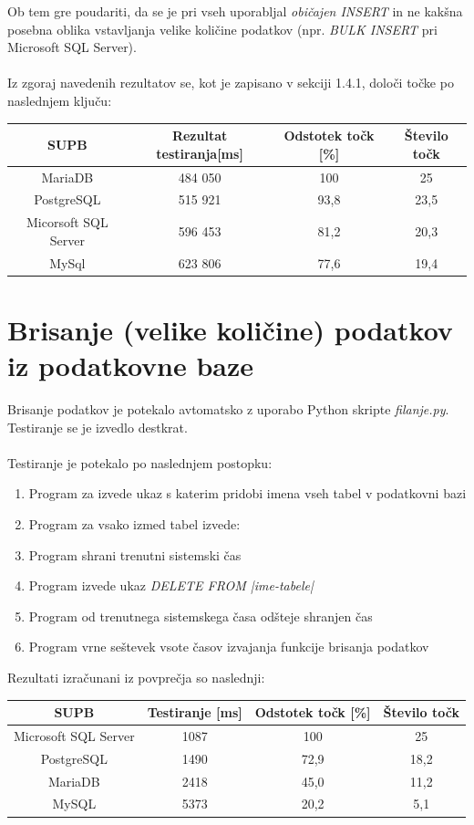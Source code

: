 \documentclass[a4paper,11pt]{report}
\begin{document}
Ob tem gre poudariti, da se je pri vseh uporabljal \textit{običajen INSERT} in ne kakšna posebna oblika vstavljanja velike količine podatkov (npr. \textit{BULK INSERT} pri Microsoft SQL Server).
\\\\
Iz zgoraj navedenih rezultatov se, kot je zapisano v sekciji 1.4.1, določi točke po naslednjem ključu:

\begin{center}
   \begin{tabular}{||c|c|c|c||}
      \hline
      \textbf{SUPB} & Rezultat testiranja[ms] & Odstotek točk [\%] & Število točk\\
      \hline
      \hline
      MariaDB & 484 050 & 100 & 25\\
      PostgreSQL & 515 921 & 93,8 & 23,5\\
      Micorsoft SQL Server & 596 453 & 81,2 & 20,3\\
      MySql & 623 806 & 77,6 & 19,4\\
      \hline
   \end{tabular}
\end{center}

\section{Brisanje (velike količine) podatkov iz podatkovne baze}
Brisanje podatkov je potekalo avtomatsko z uporabo Python skripte \textit{filanje.py}. Testiranje se je izvedlo destkrat.
\\\\

Testiranje je potekalo po naslednjem postopku:
\begin{enumerate}
   \item Program za izvede ukaz s katerim pridobi imena vseh tabel v podatkovni bazi
   \item Program za vsako izmed tabel izvede:
      \item Program shrani trenutni sistemski čas
      \item Program izvede ukaz \textit{DELETE FROM |ime-tabele|}
      \item Program od trenutnega sistemskega časa odšteje shranjen čas
   \item Program vrne seštevek vsote časov izvajanja funkcije brisanja podatkov
\end{enumerate}

\pagebreak
Rezultati izračunani iz povprečja so naslednji:
\begin{center}
   \begin{tabular}{||c|c|c|c||}
      \hline
      \textbf{SUPB} & \textbf{Testiranje [ms]} & \textbf{Odstotek točk [\%] } & \textbf{Število točk}\\
      \hline
      \hline
      Microsoft SQL Server & 1087 & 100 & 25\\
      PostgreSQL & 1490 & 72,9 & 18,2\\
      MariaDB & 2418 & 45,0 & 11,2\\
      MySQL & 5373 & 20,2 & 5,1\\
      \hline
   \end{tabular}
\end{center}
\end{document}
